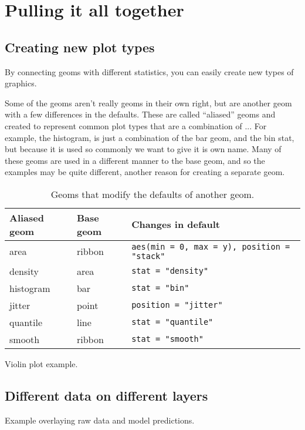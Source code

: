 \section{Pulling it all together}
\label{sec:pull-together}

\subsection{Creating new plot types}
\label{sub:new_plot_types}

By connecting geoms with different statistics, you can easily create new types of graphics.  

Some of the geoms aren't really geoms in their own right, but are another geom with a few differences in the defaults.  These are called ``aliased'' geoms and created to represent common plot types that are a combination of ...  For example, the histogram, is just a combination of the bar geom, and the bin stat, but because it is used so commonly we want to give it is own name. Many of these geoms are used in a different manner to the base geom, and so the examples may be quite different, another reason for creating a separate geom.

\begin{table}
  \begin{center}
  \begin{tabular}{lll}
    \toprule
    Aliased geom & Base geom & Changes in default \\
    \midrule
    area      & ribbon & \verb!aes(min = 0, max = y), position = "stack"!  \\
    density   & area   & \verb!stat = "density"!    \\
    histogram & bar    & \verb!stat = "bin"!        \\
    jitter    & point  & \verb!position = "jitter"! \\
    quantile  & line   & \verb!stat = "quantile"!   \\
    smooth    & ribbon & \verb!stat = "smooth"!     \\
    \bottomrule
  \end{tabular}
  \end{center}
  \caption{Geoms that modify the defaults of another geom.}
  \label{label}
\end{table}

Violin plot example.

\subsection{Different data on different layers}
\label{sub:different_data_on_different_layers}

Example overlaying raw data and model predictions.



